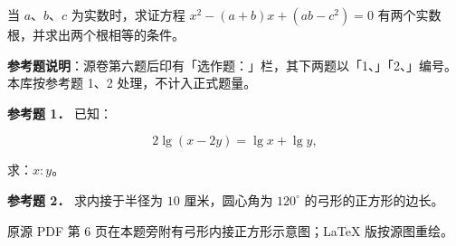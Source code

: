 \begin{question}
当 $a$、$b$、$c$ 为实数时，求证方程 $x^2-(a+b)x+(ab-c^2)=0$ 有两个实数根，并求出两个根相等的条件。

\begin{gktip}
\textbf{参考题说明}：源卷第六题后印有「选作题：」栏，其下两题以「1、」「2、」编号。本库按参考题 1、2 处理，不计入正式题量。
\end{gktip}

\textbf{参考题 1．} 已知：

\nopagebreak[4]
\[
2\lg(x-2y)=\lg x+\lg y,
\]

求：$x:y$。

\textbf{参考题 2．} 求内接于半径为 $10$ 厘米，圆心角为 $120^\circ$ 的弓形的正方形的边长。

\begin{gktip}
原源 PDF 第 6 页在本题旁附有弓形内接正方形示意图；LaTeX 版按源图重绘。
\end{gktip}
\nopagebreak[4]
\begin{center}\end{center}
\nopagebreak[4]

\end{question}